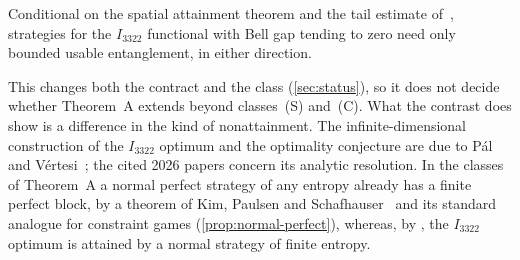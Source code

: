 \begin{theoremE}
Conditional on the spatial attainment theorem and the tail estimate of~\cite{Dou26}, strategies for the $I_{3322}$ functional
with Bell gap tending to zero need only bounded usable entanglement, in either direction.
\end{theoremE}

This changes both the contract and the class (\cref{sec:status}), so it does not decide whether Theorem~A extends beyond
classes~(S) and~(C). What the contrast does show is a difference in the kind of nonattainment. The infinite-dimensional
construction of the $I_{3322}$ optimum and the optimality conjecture are due to P\'al and V\'ertesi~\cite{PV10}; the cited 2026
papers concern its analytic resolution. In the
classes of Theorem~A a normal perfect strategy of any entropy already has a finite perfect block, by a theorem of Kim, Paulsen
and Schafhauser~\cite{KPS18} and its standard analogue for constraint games (\cref{prop:normal-perfect}), whereas, by
\cite[Theorem~2 and Section~5.2]{Dou26}, the $I_{3322}$ optimum is attained by a normal strategy of finite entropy.

